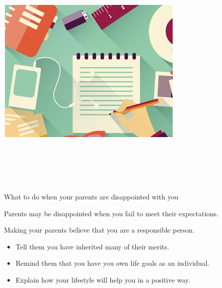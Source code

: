 \documentclass[11pt,a4paper]{article}
\begin{document}
\setlength{\columnsep}{2.2em}
\setlength{\columnseprule}{4pt}
\begin{paracol}{2}

\includegraphics[width=\linewidth]{bookcover.jpg}


\small

\\[6pt]	
\\[6pt]	
\\[6pt]
\\[6pt]





What to do when your parents are disappointed with you




Parents may be disappointed when you fail to meet their expectations.


Making your parents believe that you are a responsible person.

\begin{itemize}
    \item Tell them you have inherited many of their merits.
    \item Remind them that you have you own life goals as an individual.
    \item Explain how your lifestyle will help you in a positive way.
\end{itemize}


\end{paracol}
\end{document}
